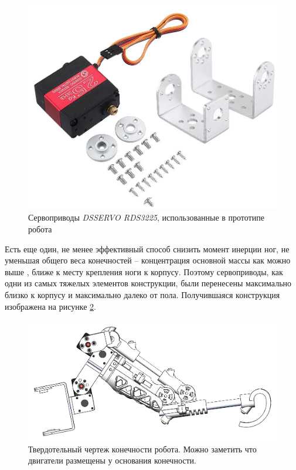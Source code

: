 \begin{figure}[h]
    \centering
    \includegraphics[scale=0.45]{chapter_mechanics_construction/figure6.png}
    \caption{Сервоприводы \textit{DSSERVO RDS3225}, использованные в прототипе робота}
    \label{}
\end{figure}

Есть еще один, не менее эффективный способ снизить момент инерции ног, не уменьшая общего веса конечностей -- концентрация основной массы как можно выше \cite{Seok2012}, ближе к месту крепления ноги к корпусу. Поэтому сервоприводы, как одни из самых тяжелых элементов конструкции, были перенесены максимально близко к корпусу и максимально далеко от пола. Получившаяся конструкция изображена на рисунке \ref{fig:figg7}.

\begin{figure}[h]
    \centering
    \includegraphics[scale=0.7]{chapter_mechanics_construction/figure7.png}
    \caption{Твердотельный чертеж конечности робота. Можно заметить что двигатели размещены у основания конечности.}
    \label{fig:figg7}
\end{figure}

